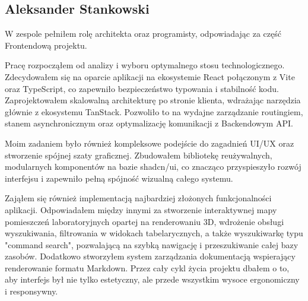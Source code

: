 \subsection{Aleksander Stankowski}
\par W zespole pełniłem rolę architekta oraz programisty, odpowiadając za część \gls{Frontend}ową projektu.
\par Pracę rozpocząłem od analizy i wyboru optymalnego stosu technologicznego.
Zdecydowałem się na oparcie aplikacji na ekosystemie \gls{React} połączonym z Vite oraz TypeScript, co zapewniło bezpieczeństwo typowania i stabilność kodu. Zaprojektowałem skalowalną architekturę po stronie klienta, wdrażając narzędzia głównie z ekosystemu TanStack.
Pozwoliło to na wydajne zarządzanie routingiem, stanem asynchronicznym oraz optymalizację komunikacji z \gls{Backend}owym \gls{API}.
\par Moim zadaniem było również kompleksowe podejście do zagadnień \gls{UI}/\gls{UX} oraz stworzenie spójnej szaty graficznej.
Zbudowałem bibliotekę reużywalnych, modularnych komponentów na bazie shadcn/ui, co znacząco przyspieszyło rozwój interfejsu i zapewniło pełną spójność wizualną całego systemu.
\par Zająłem się również implementacją najbardziej złożonych funkcjonalności aplikacji.
Odpowiadałem między innymi za stworzenie interaktywnej mapy pomieszczeń laboratoryjnych opartej na renderowaniu 3D, wdrożenie obsługi wyszukiwania, filtrowania w widokach tabelarycznych, a także wyszukiwarkę typu "command search", pozwalającą na szybką nawigację i przeszukiwanie całej bazy zasobów.
Dodatkowo stworzyłem system zarządzania dokumentacją wspierający renderowanie formatu \gls{Markdown}. Przez cały cykl życia projektu dbałem o to, aby interfejs był nie tylko estetyczny, ale przede wszystkim wysoce ergonomiczny i responsywny.


